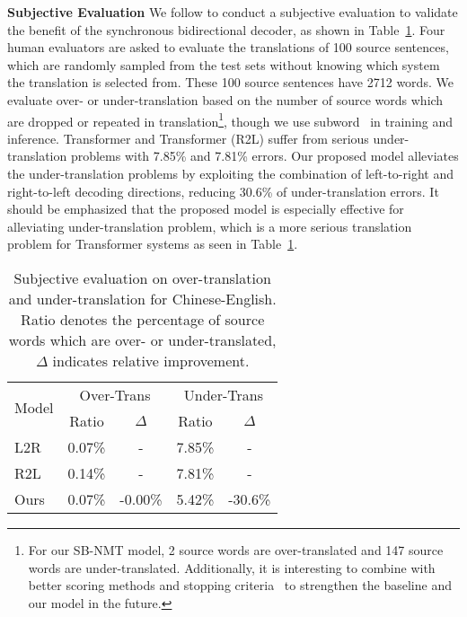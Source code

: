 \documentclass[11pt,a4paper]{article}
\begin{document}
\begin{CJK*}{UTF8}{gbsn}
\textbf{Subjective Evaluation}
We follow  to conduct a subjective evaluation to validate the benefit of the synchronous bidirectional decoder, as shown in Table~\ref{sub-evaluation}.
Four human evaluators are asked to evaluate the translations of 100 source sentences, which are randomly sampled from the test sets without knowing which system the translation is selected from.
These 100 source sentences have 2712 words. We evaluate over- or under-translation based on the number of source words which are dropped or repeated in translation{\footnote[13]{For our SB-NMT model, 2 source words are over-translated and 147 source words are under-translated. Additionally, it is interesting to combine with better scoring methods and stopping criteria~\cite{D18-1342} to strengthen the baseline and our model in the future.}}, though we use subword~\cite{Sennrich:2016A} in training and inference.
Transformer and Transformer (R2L) suffer from serious under-translation problems with 7.85\% and 7.81\% errors.
Our proposed model alleviates the under-translation problems by exploiting the combination of left-to-right and right-to-left decoding directions, reducing 30.6\% of under-translation errors.
It should be emphasized that the proposed model is especially effective for alleviating under-translation problem, which is a more serious translation problem for Transformer systems as seen in Table~\ref{sub-evaluation}.

\begin{table}
	\setlength{\belowcaptionskip}{-0.2cm}
	\centering
	\begin{tabular}{l|c|c|c|c}
		\hline
		\multirow{2}{*}{Model}    &   \multicolumn{2}{c|}{Over-Trans}  &   \multicolumn{2}{c}{Under-Trans} \\ \cline{2-5}
		&    Ratio   & $\Delta$     &    Ratio   & $\Delta$   \\
		\hline
L2R   &     0.07\%       &   -   & 7.85\%      &  -   \\
		R2L   &      0.14\%       &  -   & 7.81\%       & -   \\
		Ours  &   0.07\%     &  -0.00\%    &  5.42\%    &   -30.6\%  \\
		\hline
	\end{tabular}
	\caption{Subjective evaluation on over-translation and under-translation for Chinese-English.
		Ratio denotes the percentage of source words which are over- or under-translated, $\Delta$ indicates relative improvement.} \label{sub-evaluation}
\end{table}


\end{CJK*}
\end{document}
